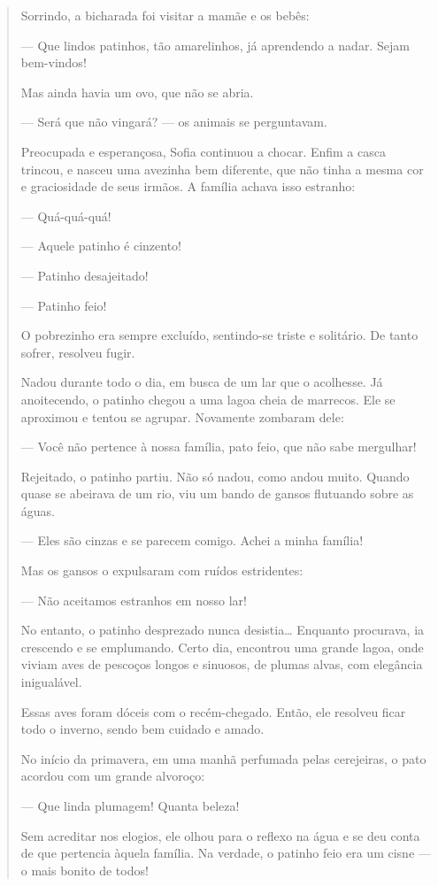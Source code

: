 \begin{conteudo}
\begin{conteudo}
\begin{conteudo}
\begin{conteudo}
\begin{quote}
Sorrindo, a bicharada foi visitar a mamãe e os bebês:

--- Que lindos patinhos, tão amarelinhos, já aprendendo a nadar. Sejam
bem-vindos!

Mas ainda havia um ovo, que não se abria.

--- Será que não vingará? --- os animais se perguntavam.

Preocupada e esperançosa, Sofia continuou a chocar. Enfim a casca
trincou, e nasceu uma avezinha bem diferente, que não tinha a mesma cor
e graciosidade de seus irmãos. A família achava isso estranho:

--- Quá-quá-quá!

--- Aquele patinho é cinzento!

--- Patinho desajeitado!

--- Patinho feio!

O pobrezinho era sempre excluído, sentindo-se triste e solitário. De
tanto sofrer, resolveu fugir.

Nadou durante todo o dia, em busca de um lar que o acolhesse. Já
anoitecendo, o patinho chegou a uma lagoa cheia de marrecos. Ele se
aproximou e tentou se agrupar. Novamente zombaram dele:

--- Você não pertence à nossa família, pato feio, que não sabe
mergulhar!

Rejeitado, o patinho partiu. Não só nadou, como andou muito. Quando
quase se abeirava de um rio, viu um bando de gansos flutuando sobre as
águas.

--- Eles são cinzas e se parecem comigo. Achei a minha família!

Mas os gansos o expulsaram com ruídos estridentes:

--- Não aceitamos estranhos em nosso lar!

No entanto, o patinho desprezado nunca desistia\ldots{} Enquanto procurava,
ia crescendo e se emplumando. Certo dia, encontrou uma grande lagoa,
onde viviam aves de pescoços longos e sinuosos, de plumas alvas, com
elegância inigualável.

Essas aves foram dóceis com o recém-chegado. Então, ele resolveu ficar
todo o inverno, sendo bem cuidado e amado.

No início da primavera, em uma manhã perfumada pelas cerejeiras, o pato
acordou com um grande alvoroço:

--- Que linda plumagem! Quanta beleza!

Sem acreditar nos elogios, ele olhou para o reflexo na água e se deu
conta de que pertencia àquela família. Na verdade, o patinho feio era um
cisne --- o mais bonito de todos!


\end{quote}
\end{conteudo}
\end{conteudo}
\end{conteudo}
\end{conteudo}
